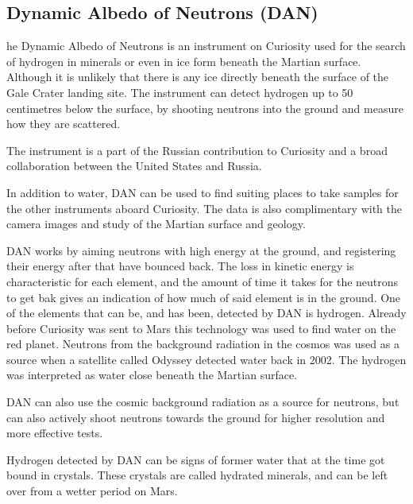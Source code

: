 \subsection*{Dynamic Albedo of Neutrons (DAN)}
he Dynamic Albedo of Neutrons is an instrument on Curiosity used for the search of hydrogen in minerals or even in ice form beneath the Martian surface.
Although it is unlikely that there is any ice directly beneath the surface of the Gale Crater landing site.
The instrument can detect hydrogen up to 50 centimetres below the surface, by shooting neutrons into the ground and measure how they are scattered.

The instrument is a part of the Russian contribution to Curiosity and a broad collaboration between the United States and Russia.

In addition to water, DAN can be used to find suiting places to take samples for the other instruments aboard Curiosity.
The data is also complimentary with the camera images and study of the Martian surface and geology.

DAN works by aiming neutrons with high energy at the ground, and registering their energy after that have bounced back.
The loss in kinetic energy is characteristic for each element, and the amount of time it takes for the neutrons to get bak gives an indication of how much of said element is in the ground.
One of the elements that can be, and has been, detected by DAN is hydrogen.
Already before Curiosity was sent to Mars this technology was used to find water on the red planet.
Neutrons from the background radiation in the cosmos was used as a source when a satellite called Odyssey detected water back in 2002.
The hydrogen was interpreted as water close beneath the Martian surface.

DAN can also use the cosmic background radiation as a source for neutrons, but can also actively shoot neutrons towards the ground for higher resolution and more effective tests.

Hydrogen detected by DAN can be signs of former water that at the time got bound in crystals.
These crystals are called hydrated minerals, and can be left over from a wetter period on Mars.